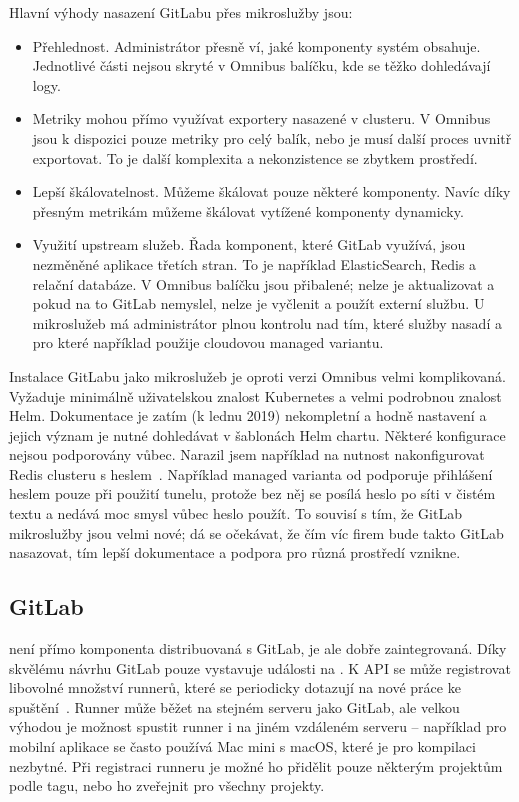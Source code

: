         Hlavní výhody nasazení GitLabu přes mikroslužby jsou:
        \begin{itemize}
            \item Přehlednost. Administrátor přesně ví, jaké komponenty systém obsahuje. Jednotlivé části nejsou skryté v Omnibus balíčku, kde se těžko dohledávají logy.
            \item Metriky mohou přímo využívat exportery nasazené v clusteru. V Omnibus jsou k dispozici pouze metriky pro celý balík, nebo je musí další proces uvnitř exportovat. To je další komplexita a nekonzistence se zbytkem prostředí.
            \item Lepší škálovatelnost. Můžeme škálovat pouze některé komponenty. Navíc díky přesným metrikám můžeme škálovat vytížené komponenty dynamicky.
            \item Využití upstream služeb. Řada komponent, které GitLab využívá, jsou nezměněné aplikace třetích stran. To je například ElasticSearch, Redis a relační databáze. V Omnibus balíčku jsou přibalené; nelze je aktualizovat a pokud na to GitLab nemyslel, nelze je vyčlenit a použít externí službu. U mikroslužeb má administrátor plnou kontrolu nad tím, které služby nasadí a pro které například použije cloudovou managed variantu.
        \end{itemize}

        Instalace GitLabu jako mikroslužeb je oproti verzi Omnibus velmi komplikovaná. Vyžaduje minimálně uživatelskou znalost Kubernetes a velmi podrobnou znalost Helm. Dokumentace je zatím (k lednu 2019) nekompletní a hodně nastavení a jejich význam je nutné dohledávat v šablonách Helm chartu. Některé konfigurace nejsou podporovány vůbec. Narazil jsem například na nutnost nakonfigurovat Redis clusteru s heslem~\cite{gitlab-helm-issue-redis}. Například managed varianta od  podporuje přihlášení heslem pouze při použití  tunelu, protože bez něj se posílá heslo po síti v čistém textu a nedává moc smysl vůbec heslo použít. To souvisí s tím, že GitLab mikroslužby jsou velmi nové; dá se očekávat, že čím víc firem bude takto GitLab nasazovat, tím lepší dokumentace a podpora pro různá prostředí vznikne.

    \subsection{GitLab \CI}
        \CI není přímo komponenta distribuovaná s GitLab, je ale dobře zaintegrovaná. Díky skvělému návrhu GitLab pouze vystavuje události na . K API se může registrovat libovolné množství runnerů, které se periodicky  dotazují na nové práce ke spuštění~\cite{gitlab-runner-registration}. Runner může běžet na stejném serveru jako GitLab, ale velkou výhodou je možnost spustit runner i na jiném vzdáleném serveru -- například pro mobilní aplikace se často používá Mac mini s macOS, které je pro kompilaci nezbytné. Při registraci runneru je možné ho přidělit pouze některým projektům podle tagu, nebo ho zveřejnit pro všechny projekty.

